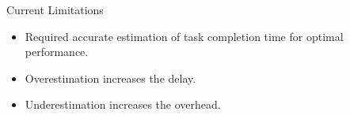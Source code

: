 \documentclass[final]{beamer}
\newlength{\onecolwid}
\begin{document}
\begin{frame}[t]
\begin{columns}[t]
\begin{column}{\onecolwid}
\begin{block}{Current Limitations}
\begin{itemize}
 \item Required accurate estimation of task completion time for optimal performance.
 \item Overestimation increases the delay.
 \item Underestimation increases the overhead.
\end{itemize}

\end{block}


\end{column} %

\end{columns} %

\end{frame} %
\end{document}
